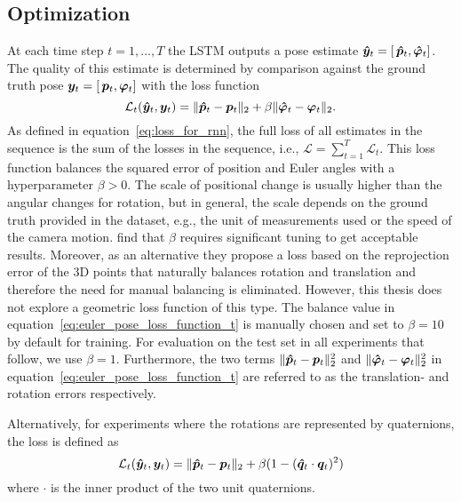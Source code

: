 		\subsection{Optimization}
			At each time step $t = 1, \dots, T$ the LSTM outputs a pose estimate 
			$\bm{\hat{y}}_t = \left[ \, \bm{\hat{p}}_t,  \bm{\hat{\varphi}}_t \right]$.
			The quality of this estimate is determined by comparison against the ground truth pose 
			$\bm{y}_t = \left[ \, \bm{p}_t,  \bm{\varphi}_t \right]$
			with the loss function
			\begin{equation}\label{eq:euler_pose_loss_function_t}
				\mathcal{L}_t(\bm{\hat{y}}_t, \bm{y}_t) = 
					\lVert \bm{\hat{p}}_t - \bm{p}_t \rVert_2 + 
					\beta \lVert \bm{\hat{\varphi}}_t - \bm{\varphi}_t \rVert_2.
			\end{equation}
			As defined in equation~\ref{eq:loss_for_rnn}, the full loss of all estimates in the sequence is the sum of the losses in the sequence, i.e., 
			$\mathcal{L} = \sum_{t = 1}^{T} \mathcal{L}_t$.
			This loss function balances the squared error of position and Euler angles with a hyperparameter $\beta > 0$.
			The scale of positional change is usually higher than the angular changes for rotation, but in general, the scale depends on the ground truth provided in the dataset, e.g., the unit of measurements used or the speed of the camera motion.
			\cite{kendall2017geometric} find that $\beta$ requires significant tuning to get acceptable results.
			Moreover, as an alternative they propose a loss based on the reprojection error of the 3D points that naturally balances rotation and translation and therefore the need for manual balancing is eliminated.
			However, this thesis does not explore a geometric loss function of this type.
			The balance value in equation~\ref{eq:euler_pose_loss_function_t} is manually chosen and set to $\beta = 10$ by default for training.
			For evaluation on the test set in all experiments that follow, we use $\beta = 1$.
			Furthermore, the two terms 
			$\lVert \bm{\hat{p}}_t - \bm{p}_t\rVert_2^2$ and 
			$\lVert \bm{\hat{\varphi}}_t - \bm{\varphi}_t \rVert_2^2$
			in equation~\ref{eq:euler_pose_loss_function_t} are referred to as the translation- and rotation errors respectively.	
			
			Alternatively, for experiments where the rotations are represented by quaternions, the loss is defined as
			\begin{equation}\label{eq:quaternion_pose_loss_function_t}
				\mathcal{L}_t(\bm{\hat{y}}_t, \bm{y}_t) = 
				\lVert \bm{\hat{p}}_t - \bm{p}_t \rVert_2 + 
				\beta (1 - (\bm{\hat{q}}_t \cdot \bm{q}_t)^2)
			\end{equation}
			where $\cdot$ is the inner product of the two unit quaternions.
			
